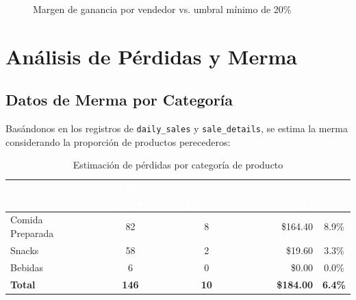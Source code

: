 \documentclass[12pt, a4paper]{article}
\begin{document}
\begin{figure}[H]
\centering
{}
\caption{Margen de ganancia por vendedor vs. umbral mínimo de 20\%}
\end{figure}

\section{Análisis de Pérdidas y Merma}

\subsection{Datos de Merma por Categoría}

Basándonos en los registros de \texttt{daily\_sales} y \texttt{sale\_details}, se estima la merma considerando la proporción de productos perecederos:

\begin{table}[H]
\centering
\caption{Estimación de pérdidas por categoría de producto}
\begin{tabular}{l c c r c}
\toprule
\rowcolor{tableheader}
\textcolor{white}{\textbf{Categoría}} & \textcolor{white}{\textbf{Uds. Vendidas}} & \textcolor{white}{\textbf{Uds. Perdidas}} & \textcolor{white}{\textbf{Costo Merma}} & \textcolor{white}{\textbf{Tasa}} \\
\midrule
Comida Preparada & 82 & 8 & \$164.40 & \textcolor{successgreen}{8.9\%} \\
\rowcolor{rowalt}
Snacks & 58 & 2 & \$19.60 & \textcolor{successgreen}{3.3\%} \\
Bebidas & 6 & 0 & \$0.00 & \textcolor{successgreen}{0.0\%} \\
\midrule
\textbf{Total} & \textbf{146} & \textbf{10} & \textbf{\$184.00} & \textbf{6.4\%} \\
\bottomrule
\end{tabular}
\end{table}
\end{document}
